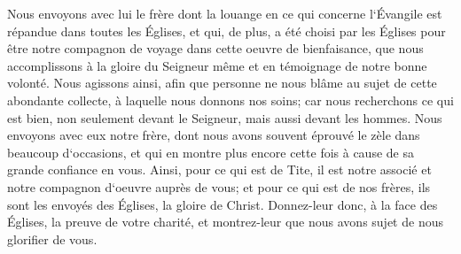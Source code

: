 \verse Nous envoyons avec lui le frère dont la louange en ce qui concerne l`Évangile est répandue dans toutes les Églises, 
\verse et qui, de plus, a été choisi par les Églises pour être notre compagnon de voyage dans cette oeuvre de bienfaisance, que nous accomplissons à la gloire du Seigneur même et en témoignage de notre bonne volonté. 
\verse Nous agissons ainsi, afin que personne ne nous blâme au sujet de cette abondante collecte, à laquelle nous donnons nos soins; 
\verse car nous recherchons ce qui est bien, non seulement devant le Seigneur, mais aussi devant les hommes. 
\verse Nous envoyons avec eux notre frère, dont nous avons souvent éprouvé le zèle dans beaucoup d`occasions, et qui en montre plus encore cette fois à cause de sa grande confiance en vous. 
\verse Ainsi, pour ce qui est de Tite, il est notre associé et notre compagnon d`oeuvre auprès de vous; et pour ce qui est de nos frères, ils sont les envoyés des Églises, la gloire de Christ. 
\verse Donnez-leur donc, à la face des Églises, la preuve de votre charité, et montrez-leur que nous avons sujet de nous glorifier de vous. 

\chapter{}

